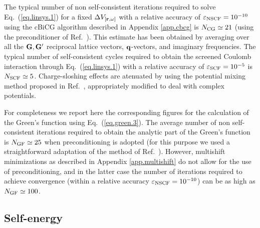 \documentclass[twocolumn,prb,showpacs,superscriptaddress]{revtex4}
\def\w{\omega}
\def\q{{\bf q}}
\def\G{{\bf G}}
\def\Gp{{\bf G^\prime}}
\def\r{{\bf r}}
\begin{document}
The typical number of non self-consistent iterations required to solve Eq.\ (\ref{eq.linsys.1})
for a fixed $\Delta V_{[\r,\w]}$ with a relative accuracy of $\varepsilon_{\rm NSCF}=10^{-10}$
using the cBiCG algorithm described in Appendix \ref{app.cbcg} is $N_{\rm CG}\simeq 21$
(using the preconditioner of Ref.\ ). This estimate has been obtained by averaging
over all the $\G,\Gp$ reciprocal lattice vectors, $\q$-vectors, and imaginary frequencies.
The typical number of self-consistent cycles required to obtain the screened Coulomb
interaction through Eq.\ (\ref{eq.linsys.1}) with a relative accuracy of $\varepsilon_{\rm SCF}=10^{-5}$ 
is $N_{\rm SCF}\simeq 5$.
%
%
Charge-sloshing effects are atenuated by using the potential mixing method proposed in
 Ref.\ , appropriately modified to deal with complex potentials. 

For completeness we report here the corresponding figures for
the calculation of the Green's function using Eq.~(\ref{eq.green.3}). The average number
of non self-consistent iterations required to obtain the analytic part of the Green's
function is $N_{\rm GF}\simeq 25$ when preconditioning is adopted (for this purpose 
we used a straightforward adaptation 
of the method of Ref.\ ). However, multishift minimizations as
described in Appendix \ref{app.multishift} do not allow for the use of preconditioning, and in the
latter case the number of iterations required to achieve convergence (within a relative
accuracy $\varepsilon_{\rm NSCF}=10^{-10}$) can be as high as $N_{\rm GF}\simeq 100$. 

\subsection{Self-energy}\label{sec.5c}
\end{document}
